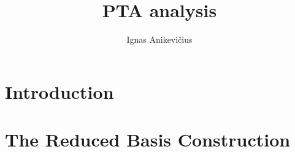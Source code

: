 \documentclass{scrreprt}
\author{Ignas Anikevičius}
\title{PTA analysis}
\begin{document}
    \maketitle
    \tableofcontents

    \chapter{Introduction}

    \chapter{The Reduced Basis Construction}
\end{document}
